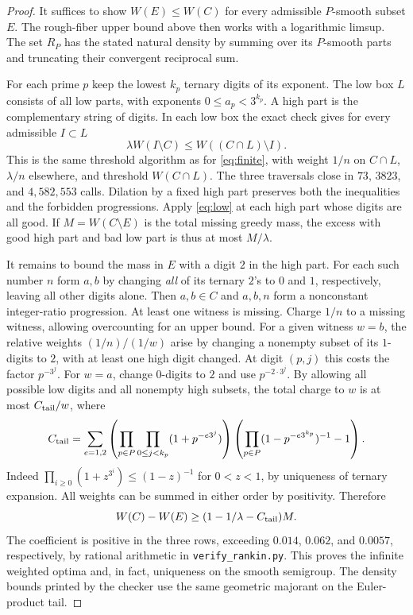 \documentclass[11pt]{article}
\begin{document}
\begin{proof}
It suffices to show $W(E)\le W(C)$ for every admissible $P$-smooth subset $E$. The rough-fiber upper bound above then works with a logarithmic limsup. The set $R_P$ has the stated natural density by summing over its $P$-smooth parts and truncating their convergent reciprocal sum.

For each prime $p$ keep the lowest $k_p$ ternary digits of its exponent. The low box $L$ consists of all low parts, with exponents $0\le a_p<3^{k_p}$. A high part is the complementary string of digits. In each low box the exact check gives for every admissible $I\subset L$
\begin{equation}
      \lambda W(I\setminus C)\le W((C\cap L)\setminus I).\label{eq:low}
\end{equation}
This is the same threshold algorithm as for \eqref{eq:finite}, with weight $1/n$ on $C\cap L$, $\lambda/n$ elsewhere, and threshold $W(C\cap L)$. The three traversals close in $73$, $3823$, and $4,582,553$ calls. Dilation by a fixed high part preserves both the inequalities and the forbidden progressions. Apply \eqref{eq:low} at each high part whose digits are all good. If $M=W(C\setminus E)$ is the total missing greedy mass, the excess with good high part and bad low part is thus at most $M/\lambda$.

It remains to bound the mass in $E$ with a digit $2$ in the high part. For each such number $n$ form $a,b$ by changing \emph{all} of its ternary $2$'s to $0$ and $1$, respectively, leaving all other digits alone. Then $a,b\in C$ and $a,b,n$ form a nonconstant integer-ratio progression. At least one witness is missing. Charge $1/n$ to a missing witness, allowing overcounting for an upper bound. For a given witness $w=b$, the relative weights $(1/n)/(1/w)$ arise by changing a nonempty subset of its $1$-digits to $2$, with at least one high digit changed. At digit $(p,j)$ this costs the factor $p^{-3^j}$. For $w=a$, change $0$-digits to $2$ and use $p^{-2\cdot3^j}$. By allowing all possible low digits and all nonempty high subsets, the total charge to $w$ is at most $C_{\rm tail}/w$, where
\[
 C_{\rm tail}=\sum_{e=1,2}
 \left(\prod_{p\in P}\prod_{0\le j<k_p}(1+p^{-e3^j})\right)
 \left(\prod_{p\in P}(1-p^{-e3^{k_p}})^{-1}-1\right).
\]
Indeed $\prod_{i\ge0}(1+z^{3^i})\le(1-z)^{-1}$ for $0<z<1$, by uniqueness of ternary expansion. All weights can be summed in either order by positivity. Therefore
\[
 W(C)-W(E)\ge (1-1/\lambda-C_{\rm tail})M.
\]
The coefficient is positive in the three rows, exceeding $0.014$, $0.062$, and $0.0057$, respectively, by rational arithmetic in \texttt{verify\_rankin.py}. This proves the infinite weighted optima and, in fact, uniqueness on the smooth semigroup. The density bounds printed by the checker use the same geometric majorant on the Euler-product tail.
\end{proof}
\end{document}
